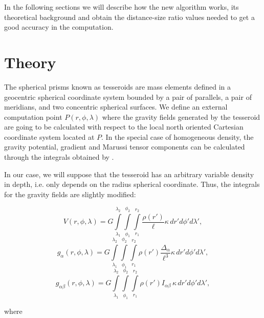 \documentclass[extra]{gji}
\begin{document}
In the following sections we will describe how the new algorithm works, its theoretical background and obtain the distance-size ratio values needed to get a good accuracy in the computation.


\section{Theory}

The spherical prisms known as tesseroids are mass elements defined in a geocentric spherical coordinate system bounded by a pair of parallels, a pair of  meridians, and two concentric spherical surfaces.
We define an external computation point $P(r, \phi, \lambda)$ where the gravity fields generated by the tesseroid are going to be calculated with respect to the local north oriented Cartesian coordinate system located at $P$.
In the special case of homogeneous density, the gravity potential, gradient and Marussi tensor components can be calculated through the integrals obtained by \citet{Grombein2013} \citep[see also][]{Uieda2016}.

In our case, we will suppose that the tesseroid has an arbitrary variable density in depth, i.e. only depends on the radius spherical coordinate.
Thus, the integrals for the gravity fields are slightly modified:

\begin{equation}
    V(r,\phi,\lambda) = G
    \int\limits_{\lambda_1}^{\lambda_2}
    \int\limits_{\phi_1}^{\phi_2}
    \int\limits_{r_1}^{r_2}
    \frac{\rho(r')}{\ell} \kappa \,  dr' d\phi' d\lambda',
\label{eq:tesseroid-pot}
\end{equation}
\begin{equation}
    g_{\alpha}(r,\phi,\lambda) = G
    \int\limits_{\lambda_1}^{\lambda_2}
    \int\limits_{\phi_1}^{\phi_2}
    \int\limits_{r_1}^{r_2}
    \rho(r') \frac{\Delta_\alpha}{\ell^3}
    \kappa \, dr' d\phi' d\lambda',
\label{eq:tesseroid-grav}
\end{equation}
\begin{equation}
    g_{\alpha\beta}(r,\phi,\lambda) = G
    \int\limits_{\lambda_1}^{\lambda_2}
    \int\limits_{\phi_1}^{\phi_2}
    \int\limits_{r_1}^{r_2}
    \rho(r') I_{\alpha\beta} \, \kappa \, dr' d\phi' d\lambda' ,
    \label{eq:tesseroid-tensor}
\end{equation}

\noindent where
\end{document}
